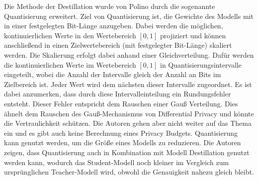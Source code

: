 Die Methode der Destillation wurde von Polino \etal \cite{P-62} durch die sogenannte Quantisierung erweitert.
Ziel von Quantisierung ist, die Gewichte des Modells mit in einer festgelegten Bit-Länge anzugeben.
Dabei werden die möglichen, kontinuierlichen Werte in den Wertebereich $[0,1]$ projiziert und können anschließend in einen Zielwertebereich (mit festgelegter Bit-Länge) skaliert werden.
Die Skalierung erfolgt dabei anhand einer Gleichverteilung.
Dafür werden die kontinuierlichen Werte im Wertebereich $[0,1]$ in Quantisierungsintervalle eingeteilt, wobei die Anzahl der Intervalle gleich der Anzahl an Bits im Zielbereich ist.
Jeder Wert wird dem nächsten dieser Intervalle zugeordnet.
Es ist dabei anzumerken, dass durch diese Intervalleinteilung ein Rundungsfehler entsteht.
Dieser Fehler entspricht dem Rauschen einer Gauß Verteilung.
Dies ähnelt dem Rauschen des Gauß-Mechanismus von Differential Privacy und könnte die Vertraulichkeit schützen.
Die Autoren gehen aber nicht weiter auf das Thema ein und es gibt auch keine Berechnung eines Privacy Budgets.
Quantisierung kann genutzt werden, um die Größe eines Modells zu reduzieren.
Die Autoren zeigen, dass Quantisierung auch in Kombination mit Modell Destillation genutzt werden kann, wodurch das Student-Modell noch kleiner im Vergleich zum ursprünglichen Teacher-Modell wird, obwohl die Genauigkeit nahezu gleich bleibt.
